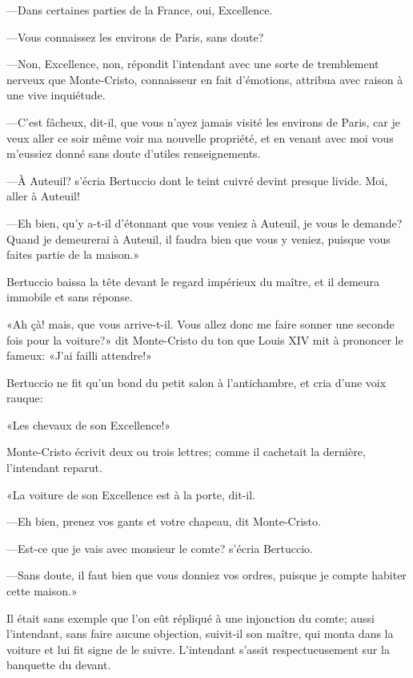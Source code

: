 —Dans certaines parties de la France, oui, Excellence. 

—Vous connaissez les environs de Paris, sans doute? 

—Non, Excellence, non, répondit l'intendant avec une sorte de tremblement nerveux que Monte-Cristo, connaisseur en fait d'émotions, attribua avec raison à une vive inquiétude.  

—C'est fâcheux, dit-il, que vous n'ayez jamais visité les environs de Paris, car je veux aller ce soir même voir ma nouvelle propriété, et en venant avec moi vous m'eussiez donné sans doute d'utiles renseignements. 

—À Auteuil? s'écria Bertuccio dont le teint cuivré devint presque livide. Moi, aller à Auteuil! 

—Eh bien, qu'y a-t-il d'étonnant que vous veniez à Auteuil, je vous le demande? Quand je demeurerai à Auteuil, il faudra bien que vous y veniez, puisque vous faites partie de la maison.» 

Bertuccio baissa la tête devant le regard impérieux du maître, et il demeura immobile et sans réponse. 

«Ah çà! mais, que vous arrive-t-il. Vous allez donc me faire sonner une seconde fois pour la voiture?» dit Monte-Cristo du ton que Louis XIV mit à prononcer le fameux: «J'ai failli attendre!» 

Bertuccio ne fit qu'un bond du petit salon à l'antichambre, et cria d'une voix rauque: 

«Les chevaux de son Excellence!» 

Monte-Cristo écrivit deux ou trois lettres; comme il cachetait la dernière, l'intendant reparut. 

«La voiture de son Excellence est à la porte, dit-il.  

—Eh bien, prenez vos gants et votre chapeau, dit Monte-Cristo. 

—Est-ce que je vais avec monsieur le comte? s'écria Bertuccio. 

—Sans doute, il faut bien que vous donniez vos ordres, puisque je compte habiter cette maison.» 

Il était sans exemple que l'on eût répliqué à une injonction du comte; aussi l'intendant, sans faire aucune objection, suivit-il son maître, qui monta dans la voiture et lui fit signe de le suivre. L'intendant s'assit respectueusement sur la banquette du devant. 